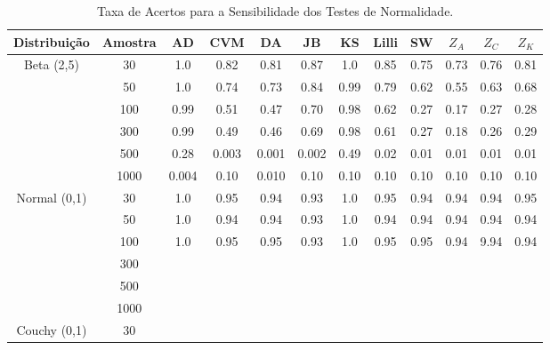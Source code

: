 \documentclass[final]{beamer}
\begin{document}
\begin{frame}[t]
\begin{columns}[t,totalwidth=0.6\paperwidth]
\begin{column}{0.45\paperwidth}
\begin{table}[H]
    \centering
    \caption{Taxa de Acertos para a Sensibilidade dos Testes de Normalidade.}
    \begin{tabular}{c|c|c|c|c|c|c|c|c|c|c|c}
    \hline \hline
Distribuição              & Amostra &   AD  & CVM  &  DA   & JB   &  KS   & Lilli &  SW  & $Z_{A}$ & $Z_{C}$ & $Z_{K}$ \\
    \hline
\multirow{6}{*}{Beta (2,5)} 
                          & 30      & 1.0   & 0.82 & 0.81  & 0.87 &  1.0  &  0.85  &  0.75 &  0.73  & 0.76   & 0.81   \\
                          & 50      & 1.0   & 0.74 & 0.73  & 0.84 &  0.99 &  0.79  &  0.62 &  0.55  & 0.63   & 0.68   \\
                          & 100     & 0.99  & 0.51 & 0.47  & 0.70 &  0.98 &  0.62  &  0.27 &  0.17  & 0.27   & 0.28   \\
                          & 300     & 0.99  & 0.49 & 0.46  & 0.69 &  0.98 &  0.61  &  0.27 &  0.18  & 0.26   & 0.29    \\
                          & 500     & 0.28  & 0.003 & 0.001  & 0.002 & 0.49  & 0.02 & 0.01  & 0.01  & 0.01   & 0.01     \\
                          & 1000    & 0.004  & 0.10  & 0.010  & 0.10 & 0.10  & 0.10  & 0.10  & 0.10  & 0.10  & 0.10       \\
                          \hline\hline
\multirow{6}{*}{Normal (0,1)}   
                          & 30      & 1.0   & 0.95  & 0.94  & 0.93 &  1.0  &  0.95  & 0.94  &  0.94  &  0.94  & 0.95   \\
                          &  50     & 1.0   & 0.94  &  0.94 & 0.93 &  1.0  &  0.94  & 0.94  &  0.94  &  0.94  & 0.94    \\
                          & 100     & 1.0   &  0.95 &  0.95 & 0.93 &  1.0  &  0.95  & 0.95  &  0.94  &  9.94  & 0.94   \\
                          & 300     &       &       &       &      &       &        &       &        &        &        \\
                          & 500     &       &       &       &      &       &        &       &        &        &        \\
                          & 1000    &       &       &       &      &       &        &       &        &        &        \\  
                          \hline\hline
\multirow{6}{*}{Couchy (0,1)}     
                         & 30       &       &       &       &      &       &             &       &         &         &        \\

\end{tabular}
\end{table}
\end{column}
\end{columns}
\end{frame}
\end{document}
